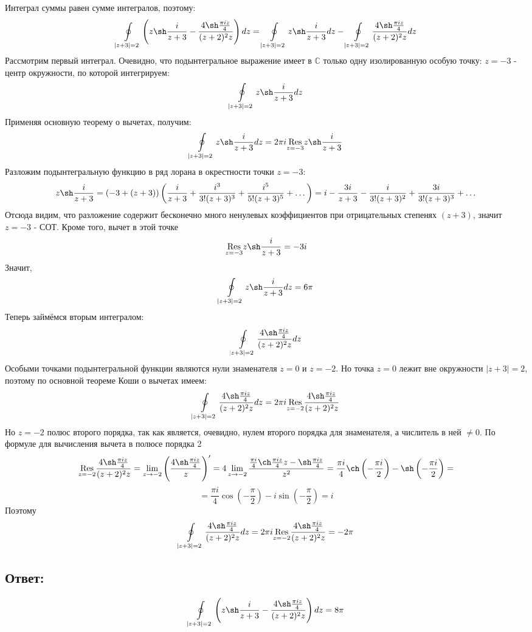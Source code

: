 \documentclass{article}
\begin{document}
	Интеграл суммы равен сумме интегралов, поэтому:
	\[\oint\limits_{|z+3|=2}\left(z \sh \frac{i}{z+3} - \frac{4 \sh \frac{\pi i z}{4}}{(z+2)^2z}\right) dz = \oint\limits_{|z+3|=2}z \sh \frac{i}{z+3}dz - \oint\limits_{|z+3|=2} \frac{4 \sh \frac{\pi i z}{4}}{(z+2)^2z} dz\]
	Рассмотрим первый интеграл. Очевидно, что подынтегральное выражение имеет в $\mathbb{C}$ только одну изолированную особую точку:  $z=-3$ -  центр окружности, по которой интегрируем:
	\[\oint\limits_{|z+3|=2}z \sh \frac{i}{z+3}dz\]
	Применяя основную теорему о вычетах, получим:
	\[\oint\limits_{|z+3|=2}z \sh \frac{i}{z+3}dz = 2\pi i \underset{z=-3}{\text{Res}}z\sh\frac{i}{z+3}\]
	Разложим подынтегральную функцию в ряд лорана в окрестности точки $z=-3$:
	\[z\sh\frac{i}{z+3} = (-3 + (z+3))\left(\frac{i}{z+3} + \frac{i^3}{3!(z+3)^3} + \frac{i^5}{5!(z+3)^5} +\dots\right) = i - \frac{3i}{z+3} - \frac{i}{3!(z+3)^2} + \frac{3i}{3!(z+3)^3} + \dots\]
	Отсюда видим, что разложение содержит бесконечно много ненулевых коэффициентов при отрицательных степенях $(z+3)$, значит $z=-3$ - СОТ. \newline 
	Кроме того, вычет в этой точке 
	\[\underset{z=-3}{\text{Res}}z\sh\frac{i}{z+3} = -3i\]
	Значит,
	\[\oint\limits_{|z+3|=2}z \sh \frac{i}{z+3}dz = 6\pi\]
	Теперь займёмся вторым интегралом:
	\[\oint\limits_{|z+3|=2} \frac{4 \sh \frac{\pi i z}{4}}{(z+2)^2z} dz\]
	Особыми точками подынтегральной функции являются нули знаменателя $z=0$ и $z=-2$. Но точка $z=0$ лежит вне окружности $|z+3|=2$, поэтому по основной теореме Коши о вычетах имеем:
	\[\oint\limits_{|z+3|=2} \frac{4 \sh \frac{\pi i z}{4}}{(z+2)^2z} dz = 2\pi i \underset{z=-2}{\text{Res}}\frac{4 \sh \frac{\pi i z}{4}}{(z+2)^2z} \]
	Но $z=-2$ полюс второго порядка, так как является, очевидно, нулем второго порядка для знаменателя, а числитель в ней $\ne 0$. По
	формуле для вычисления вычета в полюсе порядка 2
	\[\underset{z=-2}{\text{Res}}\frac{4 \sh \frac{\pi i z}{4}}{(z+2)^2z} = \lim\limits_{z\rightarrow -2} \left(\frac{4 \sh \frac{\pi i z}{4}}{z}\right)' = 4\lim\limits_{z\rightarrow-2}\frac{\frac{\pi i}{4}\ch\frac{\pi i z}{4}z - \sh\frac{\pi i z}{4}}{z^2} = \frac{\pi i }{4}\ch\left(-\frac{\pi i}{2}\right) - \sh \left(-\frac{\pi i}{2}\right) =\]
	\[=\frac{\pi i }{4}\cos\left(-\frac{\pi}{2}\right) - i\sin \left(-\frac{\pi}{2}\right) = i\]
	Поэтому
	\[\oint\limits_{|z+3|=2} \frac{4 \sh \frac{\pi i z}{4}}{(z+2)^2z} dz = 2\pi i \underset{z=-2}{\text{Res}}\frac{4 \sh \frac{\pi i z}{4}}{(z+2)^2z} = -2\pi\]
	\subsection{Ответ:}
	\[\oint\limits_{|z+3|=2}\left(z \sh \frac{i}{z+3} - \frac{4 \sh \frac{\pi i z}{4}}{(z+2)^2z}\right) dz = 8\pi\]
	
\end{document}
